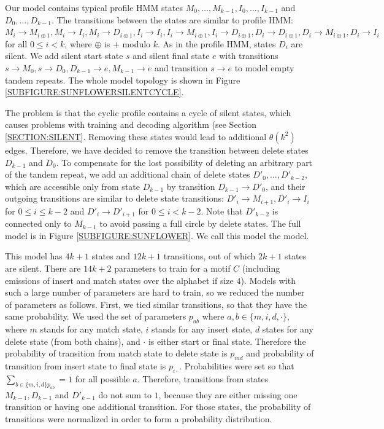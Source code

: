 Our model contains typical profile HMM states $M_0,\dots, M_{k-1}, I_{0}, \dots, I_{k-1}$
and $D_{0}, \dots, D_{k-1}$. The transitions between the states are similar to
profile HMM:  $M_{i}\to M_{i\oplus 1}, M_i\to I_i, M_i\to D_{i\oplus 1}, I_i\to
I_i, I_i\to M_{i\oplus 1}, I_i\to D_{i\oplus 1}, D_{i}\to D_{i \oplus 1},
D_{i}\to M_{i\oplus 1}, D_{i}\to I_i$ for all $0\leq i < k$, where $\oplus$ is
$+$ modulo $k$. As in the profile HMM, states $D_i$
are silent. We add silent start state $s$ and silent final state
$e$ with transitions $s\to M_0, s\to D_0, D_{k-1}\to e, M_{k-1}\to e$ and
transition $s\to e$ to model empty tandem repeats. The whole model topology is shown in
Figure \ref{SUBFIGURE:SUNFLOWERSILENTCYCLE}.

The problem is that the cyclic profile contains a cycle of silent states, which
causes problems with training and decoding algorithm (see Section
\ref{SECTION:SILENT}. Removing these states would lead to additional
$\theta(k^2)$ edges. Therefore, we have decided to remove
the transition between delete states $D_{k-1}$ and $D_0$. To compensate for the lost
possibility of deleting an arbitrary part of the tandem repeat, we add an
additional chain of delete states $D'_0, \dots, D'_{k-2}$, which are accessible
only from state $D_{k-1}$ by transition $D_{k-1}\to D'_0$, and their outgoing
transitions are similar to delete state transitions: $D'_{i}\to M_{i+1},
D'_{i}\to I_i$ for $0\leq i\leq k-2$ and $D'_{i} \to D'_{i+1}$ for $0\leq i <
k-2$. Note that $D'_{k-2}$ is connected only to $M_{k-1}$ to avoid passing a
full circle by delete states. The full model is in Figure
\ref{SUBFIGURE:SUNFLOWER}. We call this model the  model.

This model has $4k+1$ states and $12k+1$ transitions, out of which $2k+1$
states are silent. There are $14k+2$ parameters to train for a motif $C$
(including emissions of insert and match states over the alphabet if size $4$).
Models with such a large number of parameters are hard to train, so we reduced
the number of parameters as follows. First, we tied similar transitions, so
that they have the same probability.  We used the set of parameters $p_{ab}$
where $a,b\in \{m, i, d, \cdot\}$, where $m$ stands for any match state, $i$
stands for any insert state, $d$ states for any delete state (from both
chains), and $\cdot$ is either start or final state. Therefore the probability
of transition from match state to delete state is $p_{md}$ and probability of
transition from insert state to final state is $p_{i\cdot}$.  Probabilities
were set so that $\sum_{b\in\{m,i,d\} p_{ab}}=1$ for all possible $a$.
Therefore, transitions from states $M_{k-1}, D_{k-1}$ and $D'_{k-1}$ do not sum
to $1$, because they are either missing one transition or having one additional
transition. For those states, the probability of transitions were normalized in
order to form a probability distribution. 

